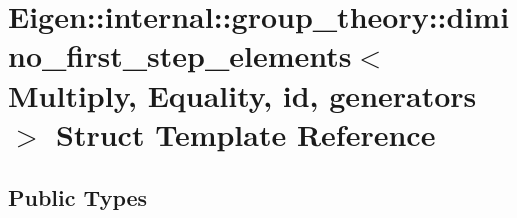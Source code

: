 \hypertarget{struct_eigen_1_1internal_1_1group__theory_1_1dimino__first__step__elements}{}\section{Eigen\+:\+:internal\+:\+:group\+\_\+theory\+:\+:dimino\+\_\+first\+\_\+step\+\_\+elements$<$ Multiply, Equality, id, generators $>$ Struct Template Reference}
\label{struct_eigen_1_1internal_1_1group__theory_1_1dimino__first__step__elements}
\subsection*{Public Types}

